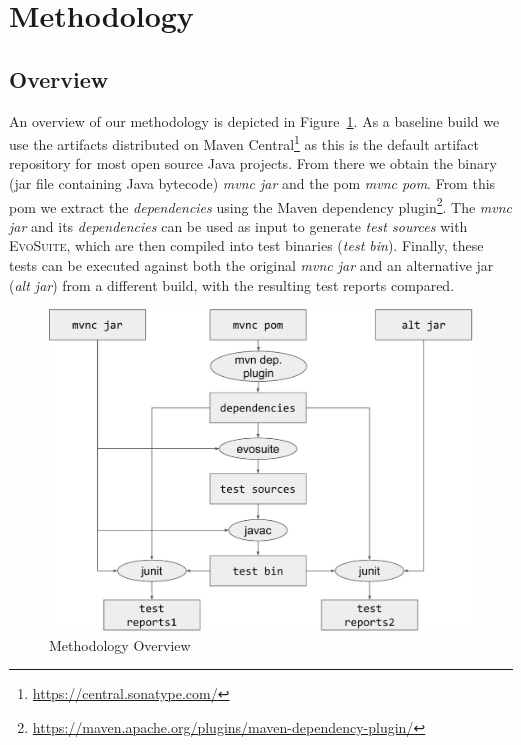 \documentclass[conference]{IEEEtran}
\makeatletter
\newcommand{\evosuite}{\textsc{EvoSuite}\@\xspace}
\makeatother
\begin{document}
\section{Methodology}
\label{sec:methodology}


\subsection{Overview}

An overview of our methodology is depicted in Figure~\ref{fig:methodology}.  As a baseline build we use the artifacts distributed on Maven Central\footnote{\url{https://central.sonatype.com/}} as this is the default artifact repository for most open source Java projects.  From there we obtain the binary (jar file containing Java bytecode) \textit{mvnc jar} and the pom \textit{mvnc pom}. From this pom we extract the \textit{dependencies} using the Maven dependency plugin\footnote{\url{https://maven.apache.org/plugins/maven-dependency-plugin/}}. The \textit{mvnc jar} and its \textit{dependencies} can be used as input to generate \textit{test sources} with \evosuite, which are then compiled into test binaries (\textit{test bin}). Finally, these tests can be executed against both the original \textit{mvnc jar} and an alternative jar (\textit{alt jar}) from a different build, with the resulting test reports compared.

\begin{figure}[t!]
	\centering
	\includegraphics[width=\columnwidth]{figures/methodology.pdf}
	\caption{Methodology Overview \label{fig:methodology}}
\end{figure}
\end{document}
